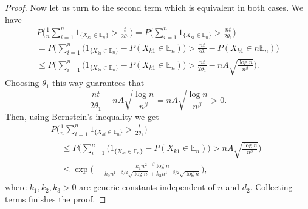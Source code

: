 \begin{lemma}
\begin{proof}
        Now let us turn to the second term which is equivalent in both cases. We have
        \begin{multline*}
            P\Big(\frac{1}{n} \sum_{i = 1}^n 1_{\{X_{ki} \in \mathbb{E}_n\}} > \frac{t}{2\theta_1}\Big) = P\Big(\sum_{i = 1}^n 1_{\{X_{ki} \in \mathbb{E}_n\}} > \frac{nt}{2\theta_1}\Big) \\
            = P\Big(\sum_{i = 1}^n\big(1_{\{X_{ki} \in \mathbb{E}_n\}} - P(X_{k1} \in \mathbb{E}_n)\big) > \frac{nt}{2\theta_1} - P(X_{k1} \in n\mathbb{E}_n)\Big) \\
            \leq P\Big(\sum_{i = 1}^n\big(1_{\{X_{ki} \in \mathbb{E}_n\}} - P(X_{k1} \in \mathbb{E}_n)\big) > \frac{nt}{2\theta_1} - nA\sqrt{\frac{\log n}{n^\beta}}\Big).
        \end{multline*}
        Choosing $\theta_1$ this way guarantees that 
        \begin{equation*}
            \frac{nt}{2\theta_1} - nA\sqrt{\frac{\log n}{n^\beta}} = nA\sqrt{\frac{\log n}{n^\beta}} > 0.
        \end{equation*}
        Then, using Bernstein's inequality we get
        \begin{multline*}
         P\Big(\frac{1}{n} \sum_{i = 1}^n 1_{\{X_{ki} \in \mathbb{E}_n\}} > \frac{t}{2\theta_1}\Big) \\
            \begin{aligned}
                &\leq P\Big(\sum_{i = 1}^n\big(1_{\{X_{ki} \in \mathbb{E}_n\}} - P(X_{k1} \in \mathbb{E}_n)\big) > nA\sqrt{\frac{\log n}{n^\beta}}\Big) \\
                &\leq \exp\Big(- \frac{k_1 n^{2-\beta} \log n}{k_2 n^{1-\beta/2} \sqrt{\log n} + k_3 n^{1-\beta/2} \sqrt{\log n}} \Big),
            \end{aligned}
        \end{multline*}
        where $k_1,k_2,k_3 > 0$ are generic constants independent of $n$ and $d_2$. Collecting terms finishes the proof. 
    \end{proof}
\end{lemma}

